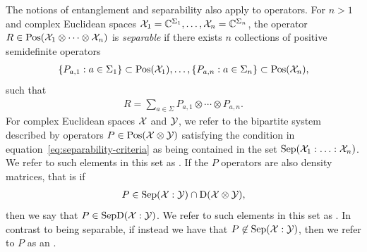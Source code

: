 The notions of entanglement and separability also apply to operators. For $n > 1$ and complex Euclidean spaces $\mathcal{X}_1 = \mathbb{C}^{\Sigma_1}, \ldots, \mathcal{X}_n = \mathbb{C}^{\Sigma_n}$, the operator $R \in \mathrm{Pos}(\mathcal{X}_1 \otimes \cdots \otimes \mathcal{X}_n)$ is \emph{separable} if there exists $n$ collections of positive semidefinite operators 
\begin{align}
	\{P_{a,1} : a \in \Sigma_1 \} \subset \mathrm{Pos}(\mathcal{X}_1), \ldots, \{ P_{a,n} : a \in \Sigma_n \} \subset \mathrm{Pos}(\mathcal{X}_n),
\end{align}
such that 
\begin{align} \label{eq:separability-criteria}
	R = \sum_{a \in \Sigma} P_{a,1} \otimes \cdots \otimes P_{a,n}.
\end{align}
For complex Euclidean spaces $\mathcal{X}$ and $\mathcal{Y}$, we refer to the bipartite system described by operators $P \in \mathrm{Pos}(\mathcal{X} \otimes \mathcal{Y})$ satisfying the condition in equation~\eqref{eq:separability-criteria} as being contained in the set $\mathrm{Sep}(\mathcal{X}_1 : \ldots : \mathcal{X}_n)$. We refer to such elements in this set as . If the $P$ operators are also density matrices, that is if 
\begin{align}
	P \in \mathrm{Sep}(\mathcal{X} : \mathcal{Y}) \cap \mathrm{D}(\mathcal{X} \otimes \mathcal{Y}),
\end{align}
then we say that $P \in \mathrm{SepD}(\mathcal{X} : \mathcal{Y})$. We refer to such elements in this set as . In contrast to being separable, if instead we have that $P \not \in \mathrm{Sep}(\mathcal{X} : \mathcal{Y})$, then we refer to $P$ as an . 

